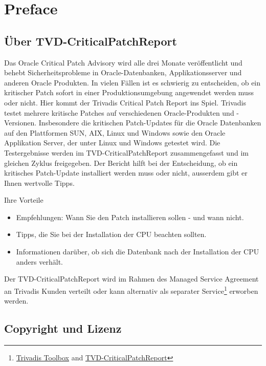 \hypertarget{preface}{%
\section{Preface}\label{preface}}

\hypertarget{uxfcber-tvd-criticalpatchreport}{%
\subsection{Über
TVD-CriticalPatchReport}\label{uxfcber-tvd-criticalpatchreport}}

Das Oracle Critical Patch Advisory wird alle drei Monate veröffentlicht
und behebt Sicherheitsprobleme in Oracle-Datenbanken, Applikationsserver
und anderen Oracle Produkten. In vielen Fällen ist es schwierig zu
entscheiden, ob ein kritischer Patch sofort in einer Produktionsumgebung
angewendet werden muss oder nicht. Hier kommt der Trivadis Critical
Patch Report ins Spiel. Trivadis testet mehrere kritische Patches auf
verschiedenen Oracle-Produkten und -Versionen. Insbesondere die
kritischen Patch-Updates für die Oracle Datenbanken auf den Plattformen
SUN, AIX, Linux und Windows sowie den Oracle Applikation Server, der
unter Linux und Windows getestet wird. Die Testergebnisse werden im
TVD-CriticalPatchReport zusammengefasst und im gleichen Zyklus
freigegeben. Der Bericht hilft bei der Entscheidung, ob ein kritisches
Patch-Update installiert werden muss oder nicht, ausserdem gibt er Ihnen
wertvolle Tipps.

Ihre Vorteile

\begin{itemize}
\tightlist
\item
  Empfehlungen: Wann Sie den Patch installieren sollen - und wann nicht.
\item
  Tipps, die Sie bei der Installation der CPU beachten sollten.
\item
  Informationen darüber, ob sich die Datenbank nach der Installation der
  CPU anders verhält.
\end{itemize}

Der TVD-CriticalPatchReport wird im Rahmen des Managed Service Agreement
an Trivadis Kunden verteilt oder kann alternativ als separater
Service\footnote{\href{https://www.trivadis.com/en/trivadis-toolbox}{Trivadis
  Toolbox} and
  \href{https://www.trivadis.com/en/trivadis-toolbox\#cpr}{TVD-CriticalPatchReport}}
erworben werden.

\hypertarget{copyright-und-lizenz}{%
\subsection{Copyright und Lizenz}\label{copyright-und-lizenz}}

